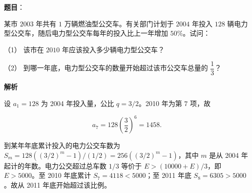 \begin{answer}

\textbf{题目}：

某市 $2003$ 年共有 $1$ 万辆燃油型公交车。有关部门计划于 $2004$ 年投入 $128$ 辆电力型公交车，随后电力型公交车每年的投入比上一年增加 $50\%$。试问：

（1） 该市在 $2010$ 年应该投入多少辆电力型公交车？

（2） 到哪一年底，电力型公交车的数量开始超过该市公交车总量的 $\dfrac{1}{3}$？

\textbf{解析}


设 $a_1=128$ 为 2004 年投入量，公比 $q=3/2$。2010 年为第 $7$ 项，故

\nopagebreak[4]
\[a_7=128\left(\frac32\right)^6=1458.\]


到某年年底累计投入的电力公交车数为 $S_m=128((3/2)^m-1)/(1/2)=256((3/2)^m-1)$，其中 $m$ 是从 2004 年起计的年数。电力公交超过总车数 $1/3$ 等价于 $E>(10000+E)/3$，即 $E>5000$。至 2010 年底累计 $S_7=4118<5000$；至 2011 年底 $S_8=6305>5000$。故从 2011 年底开始超过该比例。



\end{answer}
